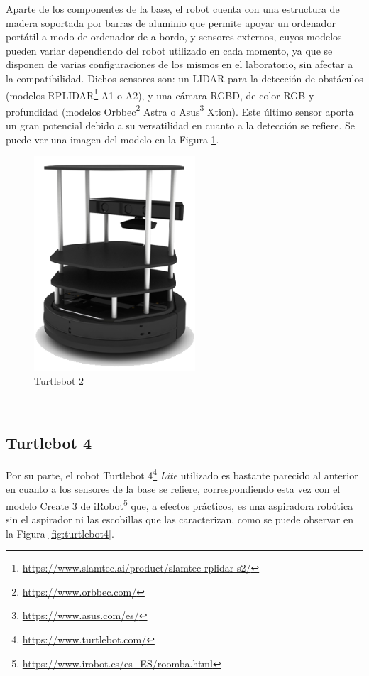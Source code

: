 Aparte de los componentes de la base, el robot cuenta con una estructura de
madera soportada por barras de aluminio que permite apoyar un ordenador
portátil a modo de ordenador de a bordo, y sensores externos, cuyos modelos
pueden variar dependiendo del robot utilizado en cada momento, ya que se
disponen de varias configuraciones de los mismos en el laboratorio, sin afectar
a la compatibilidad.
Dichos sensores son: un LIDAR para la detección de obstáculos (modelos
RPLIDAR\footnote{\href{https://www.slamtec.ai/product/slamtec-rplidar-s2/?gad_source=1&gclid=CjwKCAjwrIixBhBbEiwACEqDJdjBNB-VeyXLm1hxO33F5wKfJLRu6KRyC1aa4NfaTWvre8dR0scc8xoCMq8QAvD_BwE}{https://www.slamtec.ai/product/slamtec-rplidar-s2/}}
A1 o A2), y una cámara RGBD, de color RGB y profundidad (modelos
Orbbec\footnote{\href{https://www.orbbec.com/}{https://www.orbbec.com/}} Astra o
Asus\footnote{\href{https://www.asus.com/es/}{https://www.asus.com/es/}} Xtion).
Este último sensor aporta un gran potencial debido a su versatilidad en cuanto a
la detección se refiere.
Se puede ver una imagen del modelo en la Figura \ref{fig:turtlebot2}.
\\

\begin{figure} [h!]
  \begin{center}
    \includegraphics[width=6cm]{figs/turtlebot2}
  \end{center}
  \caption{Turtlebot 2 \cite{turtlebot4}}
  \label{fig:turtlebot2}
\end{figure}\


\subsection{Turtlebot 4}
\label{sec:turtlebot4}

Por su parte, el robot Turtlebot 4\footnote{
\href{https://www.turtlebot.com/}{https://www.turtlebot.com/}} \textit{Lite}
utilizado es bastante parecido al anterior en cuanto a los sensores de la base
se refiere, correspondiendo esta vez con el modelo Create 3 de iRobot\footnote{
\href{https://www.irobot.es/es_ES/roomba.html?gad_source=1&gclid=CjwKCAjwrIixBhBbEiwACEqDJcM6GMOs9Ew0S98K9IJvOaBGm30dR6D1pk5T09dpqwcvNVTaYr7ZTBoC3HgQAvD_BwE}{https://www.irobot.es/es\_ES/roomba.html}}
que, a efectos prácticos, es una aspiradora robótica sin el aspirador ni las
escobillas que las caracterizan, como se puede observar en la Figura
\ref{fig:turtlebot4}.
\\

